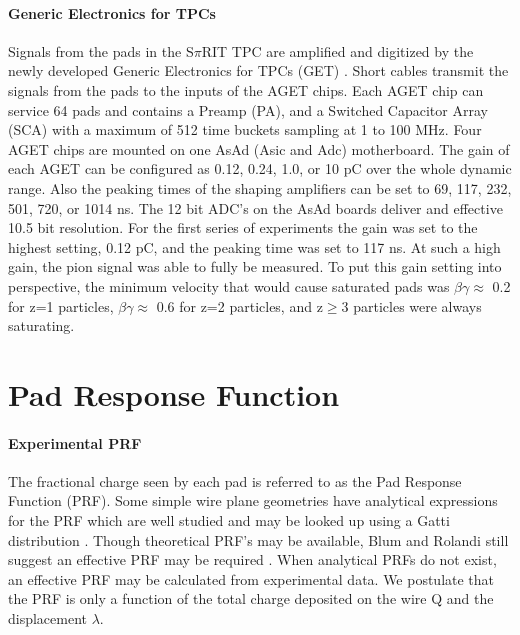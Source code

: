 \documentclass[review]{elsarticle}
\begin{document}
\paragraph{Generic Electronics for TPCs}
Signals from the pads in the S$\pi$RIT TPC are amplified and digitized by the newly developed Generic Electronics for TPCs (GET) \cite{get}.  Short cables transmit the signals from the pads to the inputs of the AGET chips. Each AGET chip can service 64 pads and contains a Preamp (PA), and a Switched Capacitor Array (SCA) with a maximum of 512 time buckets sampling at 1 to 100 MHz. Four AGET chips are mounted on one AsAd (Asic and Adc) motherboard. The gain of each AGET can be configured as 0.12, 0.24, 1.0, or 10 pC over the whole dynamic range. Also the peaking times of the shaping amplifiers can be set to 69, 117, 232, 501, 720, or 1014 ns. The 12 bit ADC's on the AsAd boards deliver and effective 10.5 bit resolution. For the first series of experiments the gain was set to the highest setting, 0.12 pC, and the peaking time was set to 117 ns. At such a high gain, the pion signal was able to fully be measured. To put this gain setting into perspective, the minimum velocity that would cause saturated pads was $\beta\gamma\approx$ 0.2 for z=1 particles, $\beta\gamma\approx$ 0.6 for z=2 particles, and z$\geq$3 particles were always saturating. 

\section{Pad Response Function}
\paragraph{Experimental PRF}
The fractional charge seen by each pad is referred to as the Pad Response Function (PRF). Some simple wire plane geometries have analytical expressions for the PRF which are well studied and may be looked up using a Gatti distribution \cite{blumrol}. Though theoretical PRF’s may be available, Blum and Rolandi still suggest an effective PRF may be required \cite{blumrol}. When analytical PRFs do not exist, an effective PRF may be calculated from experimental data. We postulate that the PRF is only a function of the total charge deposited on the wire Q and the displacement $\lambda$.
\end{document}
